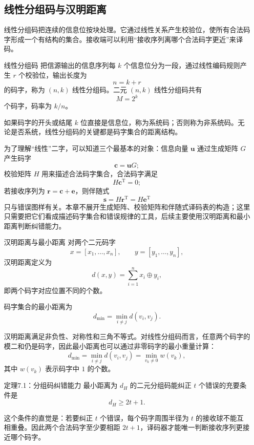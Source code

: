 \subsection{线性分组码与汉明距离}

线性分组码把连续的信息位按块处理。它通过线性关系产生校验位，使所有合法码字形成一个有结构的集合。接收端可以利用“接收序列离哪个合法码字更近”来译码。

\begin{definitionBox}{线性分组码}
把信源输出的信息序列每 $k$ 个信息位分为一段，通过线性编码规则产生 $r$ 个校验位，输出长度为
\[
n=k+r
\]
的码字，称为 $(n,k)$ 线性分组码。二元 $(n,k)$ 线性分组码共有
\[
M=2^k
\]
个码字，码率为 $k/n$。
\end{definitionBox}

如果码字的开头或结尾 $k$ 位直接是信息位，称为系统码；否则称为非系统码。无论是否系统，线性分组码的关键都是码字集合的距离结构。

为了理解“线性”二字，可以知道三个最基本的对象：信息向量 $\mathbf{u}$ 通过生成矩阵 $G$ 产生码字
\[
\mathbf{c}=\mathbf{u}G;
\]
校验矩阵 $H$ 用来描述合法码字集合，合法码字满足
\[
H\mathbf{c}^{\mathrm T}=0;
\]
若接收序列为 $\mathbf{r}=\mathbf{c}+\mathbf{e}$，则伴随式
\[
\mathbf{s}=H\mathbf{r}^{\mathrm T}=H\mathbf{e}^{\mathrm T}
\]
只与错误图样有关。本章不展开生成矩阵、校验矩阵和伴随式译码表的构造；这里只需要把它们看成描述码字集合和错误规律的工具，后续主要使用汉明距离和最小距离判断纠错能力。

\begin{definitionBox}{汉明距离与最小距离}
对两个二元码字
\[
x=[x_1,\dots,x_n],
\qquad
y=[y_1,\dots,y_n],
\]
汉明距离定义为
\[
d(x,y)=\sum_{i=1}^{n}x_i\oplus y_i,
\]
即两个码字对应位置不同的个数。

码字集合的最小距离为
\[
d_{\min}=\min_{i\ne j}d(v_i,v_j).
\]
\end{definitionBox}

汉明距离满足非负性、对称性和三角不等式。对线性分组码而言，任意两个码字的模二和仍是码字，因此最小距离也可以通过非零码字的最小重量计算：
\[
d_{\min}=\min_{i\ne j}d(v_i,v_j)
=\min_{v_k\ne0}w(v_k),
\]
其中 $w(v_k)$ 表示码字中 $1$ 的个数。

\begin{theoremBox}{定理7.1：分组码纠错能力}
最小距离为 $d_H$ 的二元分组码能纠正 $t$ 个错误的充要条件是
\[
d_H\ge 2t+1.
\]
\end{theoremBox}

这个条件的直觉是：若要纠正 $t$ 个错误，每个码字周围半径为 $t$ 的接收球不能互相重叠。因此两个合法码字至少要相距 $2t+1$，译码器才能唯一判断接收序列更接近哪个码字。

